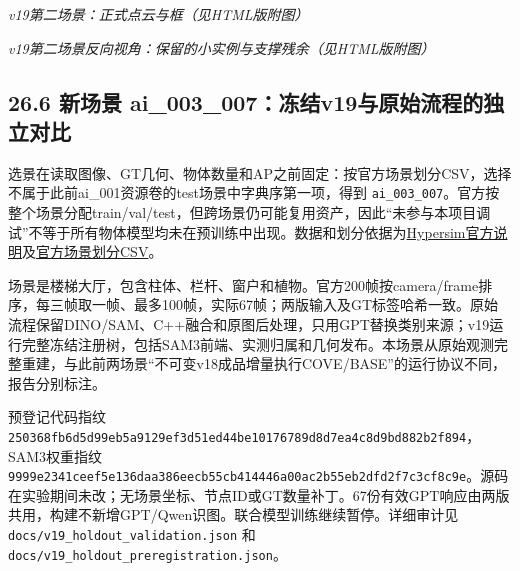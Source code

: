 \documentclass[UTF8,fontset=fandol]{ctexart}
\begin{document}
\textit{v19第二场景：正式点云与框（见HTML版附图）}



\textit{v19第二场景反向视角：保留的小实例与支撑残余（见HTML版附图）}



\subsection*{26.6 新场景 ai\_003\_007：冻结v19与原始流程的独立对比}

选景在读取图像、GT几何、物体数量和AP之前固定：按官方场景划分CSV，选择不属于此前ai\_001资源卷的test场景中字典序第一项，得到 \texttt{ai\_\allowbreak{}003\_\allowbreak{}007}。官方按整个场景分配train/val/test，但跨场景仍可能复用资产，因此“未参与本项目调试”不等于所有物体模型均未在预训练中出现。数据和划分依据为\href{https://github.com/apple-aiml-research/ml-hypersim}{Hypersim官方说明}及\href{https://raw.githubusercontent.com/apple/ml-hypersim/main/evermotion\_dataset/analysis/metadata\_images\_split\_scene\_v1.csv}{官方场景划分CSV}。



场景是楼梯大厅，包含柱体、栏杆、窗户和植物。官方200帧按camera/frame排序，每三帧取一帧、最多100帧，实际67帧；两版输入及GT标签哈希一致。原始流程保留DINO/SAM、C++融合和原图后处理，只用GPT替换类别来源；v19运行完整冻结注册树，包括SAM3前端、实测归属和几何发布。本场景从原始观测完整重建，与此前两场景“不可变v18成品增量执行COVE/BASE”的运行协议不同，报告分别标注。



预登记代码指纹 \texttt{250368fb6d5d99eb5a9129ef3d51ed44be10176789d8d7ea4c8d9bd882b2f894}，SAM3权重指纹 \texttt{9999e2341ceef5e136daa386eecb55cb414446a00ac2b55eb2dfd2f7c3cf8c9e}。源码在实验期间未改；无场景坐标、节点ID或GT数量补丁。67份有效GPT响应由两版共用，构建不新增GPT/Qwen识图。联合模型训练继续暂停。详细审计见 \texttt{docs/\allowbreak{}v19\_\allowbreak{}holdout\_\allowbreak{}validation.\allowbreak{}json} 和 \texttt{docs/\allowbreak{}v19\_\allowbreak{}holdout\_\allowbreak{}preregistration.\allowbreak{}json}。
\end{document}
